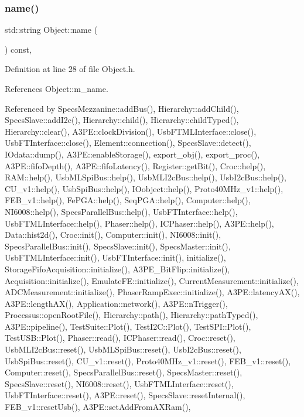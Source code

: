 \subsubsection{\texorpdfstring{name()}{name()}}
{\footnotesize\ttfamily std\+::string Object\+::name (\begin{DoxyParamCaption}{ }\end{DoxyParamCaption}) const\hspace{0.3cm}{\ttfamily [inline]}, {\ttfamily [inherited]}}



Definition at line 28 of file Object.\+h.



References Object\+::m\+\_\+name.



Referenced by Specs\+Mezzanine\+::add\+Bus(), Hierarchy\+::add\+Child(), Specs\+Slave\+::add\+I2c(), Hierarchy\+::child(), Hierarchy\+::child\+Typed(), Hierarchy\+::clear(), A3\+P\+E\+::clock\+Division(), Usb\+F\+T\+M\+L\+Interface\+::close(), Usb\+F\+T\+Interface\+::close(), Element\+::connection(), Specs\+Slave\+::detect(), I\+Odata\+::dump(), A3\+P\+E\+::enable\+Storage(), export\+\_\+obj(), export\+\_\+proc(), A3\+P\+E\+::fifo\+Depth(), A3\+P\+E\+::fifo\+Latency(), Register\+::get\+Bit(), Croc\+::help(), R\+A\+M\+::help(), Usb\+M\+L\+Spi\+Bus\+::help(), Usb\+M\+L\+I2c\+Bus\+::help(), Usb\+I2c\+Bus\+::help(), C\+U\+\_\+v1\+::help(), Usb\+Spi\+Bus\+::help(), I\+Oobject\+::help(), Proto40\+M\+Hz\+\_\+v1\+::help(), F\+E\+B\+\_\+v1\+::help(), Fe\+P\+G\+A\+::help(), Seq\+P\+G\+A\+::help(), Computer\+::help(), N\+I6008\+::help(), Specs\+Parallel\+Bus\+::help(), Usb\+F\+T\+Interface\+::help(), Usb\+F\+T\+M\+L\+Interface\+::help(), Phaser\+::help(), I\+C\+Phaser\+::help(), A3\+P\+E\+::help(), Data\+::hist2d(), Croc\+::init(), Computer\+::init(), N\+I6008\+::init(), Specs\+Parallel\+Bus\+::init(), Specs\+Slave\+::init(), Specs\+Master\+::init(), Usb\+F\+T\+M\+L\+Interface\+::init(), Usb\+F\+T\+Interface\+::init(), initialize(), Storage\+Fifo\+Acquisition\+::initialize(), A3\+P\+E\+\_\+\+Bit\+Flip\+::initialize(), Acquisition\+::initialize(), Emulate\+F\+E\+::initialize(), Current\+Measurement\+::initialize(), A\+D\+C\+Measurement\+::initialize(), Phaser\+Ramp\+Exec\+::initialize(), A3\+P\+E\+::latency\+A\+X(), A3\+P\+E\+::length\+A\+X(), Application\+::network(), A3\+P\+E\+::n\+Trigger(), Processus\+::open\+Root\+File(), Hierarchy\+::path(), Hierarchy\+::path\+Typed(), A3\+P\+E\+::pipeline(), Test\+Suite\+::\+Plot(), Test\+I2\+C\+::\+Plot(), Test\+S\+P\+I\+::\+Plot(), Test\+U\+S\+B\+::\+Plot(), Phaser\+::read(), I\+C\+Phaser\+::read(), Croc\+::reset(), Usb\+M\+L\+I2c\+Bus\+::reset(), Usb\+M\+L\+Spi\+Bus\+::reset(), Usb\+I2c\+Bus\+::reset(), Usb\+Spi\+Bus\+::reset(), C\+U\+\_\+v1\+::reset(), Proto40\+M\+Hz\+\_\+v1\+::reset(), F\+E\+B\+\_\+v1\+::reset(), Computer\+::reset(), Specs\+Parallel\+Bus\+::reset(), Specs\+Master\+::reset(), Specs\+Slave\+::reset(), N\+I6008\+::reset(), Usb\+F\+T\+M\+L\+Interface\+::reset(), Usb\+F\+T\+Interface\+::reset(), A3\+P\+E\+::reset(), Specs\+Slave\+::reset\+Internal(), F\+E\+B\+\_\+v1\+::reset\+Usb(), A3\+P\+E\+::set\+Add\+From\+A\+X\+Ram(), 